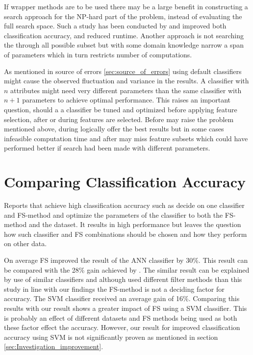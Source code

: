 If wrapper methods are to be used there may be a large benefit in constructing a search approach for the NP-hard part of the problem, instead of evaluating the full search space. Such a study has been conducted by \textcite{panthong2015} and improved both classification accuracy, and reduced runtime. Another approach is not searching the through all possible subset but with some domain knowledge narrow a span of parameters which in turn restricts number of computations.

As mentioned in source of errors \ref{sec:source_of_errors} using default classifiers might cause the observed fluctuation and variance in the results. A classifier with $n$ attributes might need very different parameters than the same classifier with $n + 1$ parameters to achieve optimal performance. This raises an important question, should a a classifier be tuned and optimized before applying feature selection, after or during features are selected. Before may raise the problem mentioned above, during logically offer the best results but in some cases infeasible computation time and after may miss feature subsets which could have performed better if search had been made with different parameters.

\section{Comparing Classification Accuracy}
\label{sec:Comparing_Classification_Accuracy}

Reports that achieve high classification accuracy such as \textcite{akay2009} decide on one classifier and FS-method and optimize the parameters of the classifier to both the FS-method and the dataset. It results in high performance but leaves the question how such classifier and FS combinations should be chosen and how they perform on other data.

On average FS improved the result of the ANN classifier by 30\%. This result can be compared with the 28\% gain achieved by \textcite{karabulut2012}. The similar result can be explained by use of similar classifiers and although \textcite{karabulut2012} used different filter methods than this study in line with our findings the FS-method is not a deciding factor for accuracy. The SVM classifier received an average gain of 16\%. Comparing this results with \textcite{b20103177} our result shows a greater impact of FS using a SVM classifier. This is probably an effect of different datasets and FS methods being used as both these factor effect the accuracy. However, our result for improved classification accuracy using SVM is not significantly proven as mentioned in section \ref{sec:Investigation_improvement}.

